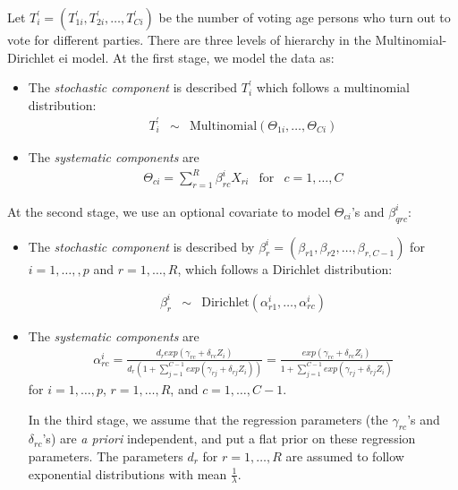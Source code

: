 Let $T_i^{'}=(T_{1i}^{'},T_{2i}^{'},\dots,T_{Ci}^{'})$ be the number
of voting age persons who turn out to vote for different parties.
There are three levels of hierarchy in the 
Multinomial-Dirichlet {\sc ei} model.  At the first stage, we model
the data as:
\begin{itemize}

\item The \emph{stochastic component} is described $T_i^{'}$ which
follows a multinomial distribution: 
\begin{eqnarray*}
T_i^{'} &\sim & \textrm{Multinomial}(\Theta_{1i},\dots,\Theta_{Ci})
\end{eqnarray*}

\item The \emph{systematic components} are
\begin{eqnarray*}
\Theta_{ci}=\sum_{r=1}^{R}\beta_{rc}^{i}X_{ri} & \textrm{for} &  c=1,\dots,C
\end{eqnarray*}

\end{itemize}

At the second stage, we use an optional covariate to model
$\Theta_{ci}$'s and $\beta_{qrc}^{i}$: 
\begin{itemize}
\item The \emph{stochastic component} is described by
$\beta_{r}^{i}=(\beta_{r1},\beta_{r2},\dots,\beta_{r,C-1})$ for 
  $i=1,\dots,,p$ and $r=1,\dots,R$,  which follows a Dirichlet distribution:

  \begin{eqnarray*}
    \beta_r^{i}  &\sim & \textrm{Dirichlet}(\alpha_{r1}^{i},\dots,\alpha_{rc}^{i})
  \end{eqnarray*}

\item The \emph{systematic components} are 
\begin{eqnarray*}
  \alpha_{rc}^{i}=\frac{d_{r}exp(\gamma_{rc}+\delta_{rc}Z_{i})}{d_r(1+\sum_{j=1}^{C-1}exp(\gamma_{rj}+\delta_{rj}Z_i))} = \frac{exp(\gamma_{rc}+\delta_{rc}Z_i)}{1+\sum_{j=1}^{C-1}exp(\gamma_{rj}+\delta_{rj}Z_i)} 
\end{eqnarray*}
for $i=1, \dots,p$, $r=1,\dots,R$, and $c=1, \dots, C-1$.

In the third stage, we assume that the regression parameters (the
$\gamma_{rc}$'s and $\delta_{rc}$'s) are \emph{a priori} independent,
and put a flat prior on these regression parameters.  The parameters
$d_{r}$ for $r=1,\dots,R$ are assumed to follow exponential distributions with
mean $\frac{1}{\lambda}$.
\end{itemize}

